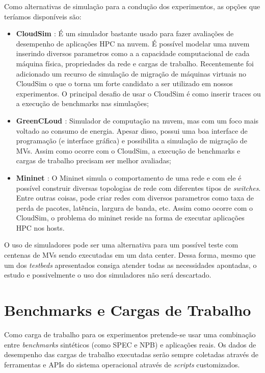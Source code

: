 \documentclass[10pt, conference, compsocconf]{IEEEtran}
\begin{document}
Como alternativas de simulação para a condução dos experimentos, as opções que teríamos disponíveis são:
\begin{itemize}
    \item \textbf{CloudSim \cite{Calheiros:2011}}: É um simulador bastante usado para fazer avaliações de desempenho de aplicações HPC na nuvem. É possível modelar uma nuvem inserindo diversos parametros como a a capacidade computacional de cada máquina física, propriedades da rede e cargas de trabalho. Recentemente foi adicionado um recurso de simulação de migração de máquinas virtuais no CloudSim o que o torna um forte candidato a ser utilizado em nossos experimentos. O principal desafio de usar o CloudSim é como inserir traces ou a execução de benchmarks nas simulações; 
    \item \textbf{GreenCLoud \cite{Kliazovich:2010}}: Simulador de computação na nuvem, mas com um foco mais voltado ao consumo de energia. Apesar disso, possui uma boa interface de programação (e interface gráfica) e possibilita a simulação de migração de MVs. Assim como ocorre com o CloudSim, a execução de benchmarks e cargas de trabalho precisam ser melhor avaliadas;
    \item \textbf{Mininet \cite{Handigol:2012}}: O Mininet simula o comportamento de uma rede e com ele é possível construir diversas topologias de rede com diferentes tipos de \textit{switches}. Entre outras coisas, pode criar redes com diversos parametros como taxa de perda de pacotes, latência, largura de banda, etc. Assim como ocorre com o CloudSim, o problema do mininet reside na forma de executar aplicações HPC nos hosts.
\end{itemize}

O uso de simuladores pode ser uma alternativa para um possível teste com centenas de MVs  sendo executadas em um data center. Dessa forma, mesmo que um dos \textit{testbeds} apresentados consiga atender todas as necessidades apontadas, o estudo e possivelmente o uso dos simuladores não será descartado.


\section{Benchmarks e Cargas de Trabalho}
Como carga de trabalho para os experimentos pretende-se usar uma combinação entre \textit{benchmarks} sintéticos (como SPEC e NPB) e aplicações reais. Os dados de desempenho das cargas de trabalho executadas serão sempre coletadas através de ferramentas e APIs do sistema operacional através de \textit{scripts} customizados.  
\end{document}
